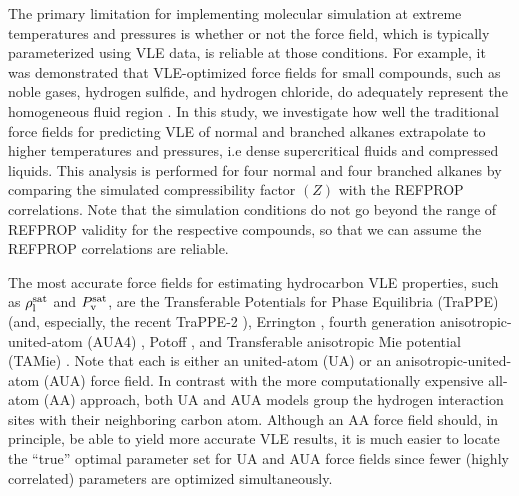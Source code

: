 \documentclass[preprint,letterpaper,floatfix,citeautoscript,aip,jcp]{revtex4-1}
\begin{document}


The primary limitation for implementing molecular simulation at extreme temperatures and pressures is whether or not the force field, which is typically parameterized using VLE data, is reliable at those conditions.  
For example, it was demonstrated that VLE-optimized force fields for small compounds, such as noble gases, hydrogen sulfide, and hydrogen chloride, do adequately represent the homogeneous fluid region \cite{Rutkai2013}. In this study, we investigate how well the traditional force fields for predicting VLE of normal and branched alkanes extrapolate to higher temperatures and pressures, i.e dense supercritical fluids and compressed liquids. This analysis is performed for four normal and four branched alkanes by comparing the simulated compressibility factor $(Z)$ with the REFPROP correlations. Note that the simulation conditions do not go beyond the range of 
REFPROP
validity for the respective compounds, so that we can assume the REFPROP correlations are reliable.

The most accurate force fields for estimating hydrocarbon VLE properties, such as $\rho_{\rm l}^{\rm sat}$ and $P_{\rm v}^{\rm sat}$, are the Transferable Potentials for Phase Equilibria (TraPPE) \cite{TraPPE,Martin1999} (and, especially, the recent TraPPE-2 \cite{TraPPEUA2}), Errington \cite{Exp6}, fourth generation anisotropic-united-atom (AUA4) \cite{AUA4,Bourasseau2002}, Potoff \cite{Mie,Potoff_branched}, and Transferable anisotropic Mie potential (TAMie) \cite{TAMie,Weidler2016}. Note that each is either an united-atom (UA) or an anisotropic-united-atom (AUA) force field. In contrast with the more computationally expensive all-atom (AA) approach, both UA and AUA models group the hydrogen interaction sites with their neighboring carbon atom. Although an AA force field 
should, in principle, be able to yield more accurate VLE results, it is much easier to locate the ``true'' optimal parameter set for UA and AUA force fields since fewer (highly correlated) parameters are optimized simultaneously.
\end{document}
